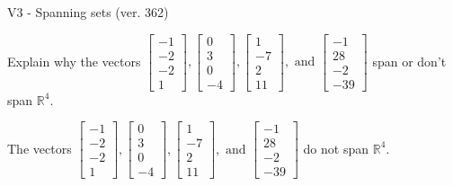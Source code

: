 \begin{exercise}
  \begin{exerciseTitle}V3 - Spanning sets (ver. 362)\end{exerciseTitle}
  \begin{exerciseStatement}
    Explain why the vectors \(\left[\begin{array}{r}
-1 \\
-2 \\
-2 \\
1
\end{array}\right] , \left[\begin{array}{r}
0 \\
3 \\
0 \\
-4
\end{array}\right] , \left[\begin{array}{r}
1 \\
-7 \\
2 \\
11
\end{array}\right] , \text{ and } \left[\begin{array}{r}
-1 \\
28 \\
-2 \\
-39
\end{array}\right]\) span or don't span \(\mathbb{R}^4\). 
	


  \end{exerciseStatement}
  \begin{exerciseAnswer}
   The vectors \(\left[\begin{array}{r}
-1 \\
-2 \\
-2 \\
1
\end{array}\right] , \left[\begin{array}{r}
0 \\
3 \\
0 \\
-4
\end{array}\right] , \left[\begin{array}{r}
1 \\
-7 \\
2 \\
11
\end{array}\right] , \text{ and } \left[\begin{array}{r}
-1 \\
28 \\
-2 \\
-39
\end{array}\right]\) 
  	 do not  
	span \(\mathbb{R}^4\).
  


  \end{exerciseAnswer}
\end{exercise}